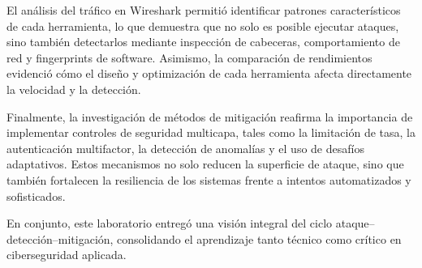 \documentclass[letter,12pt]{article}
\begin{document}
El análisis del tráfico en Wireshark permitió identificar patrones característicos de cada herramienta, lo que demuestra que no solo es posible ejecutar ataques, sino también detectarlos mediante inspección de cabeceras, comportamiento de red y fingerprints de software. Asimismo, la comparación de rendimientos evidenció cómo el diseño y optimización de cada herramienta afecta directamente la velocidad y la detección.

Finalmente, la investigación de métodos de mitigación reafirma la importancia de implementar controles de seguridad multicapa, tales como la limitación de tasa, la autenticación multifactor, la detección de anomalías y el uso de desafíos adaptativos. Estos mecanismos no solo reducen la superficie de ataque, sino que también fortalecen la resiliencia de los sistemas frente a intentos automatizados y sofisticados.

En conjunto, este laboratorio entregó una visión integral del ciclo ataque–detección–mitigación, consolidando el aprendizaje tanto técnico como crítico en ciberseguridad aplicada.
\end{document}
